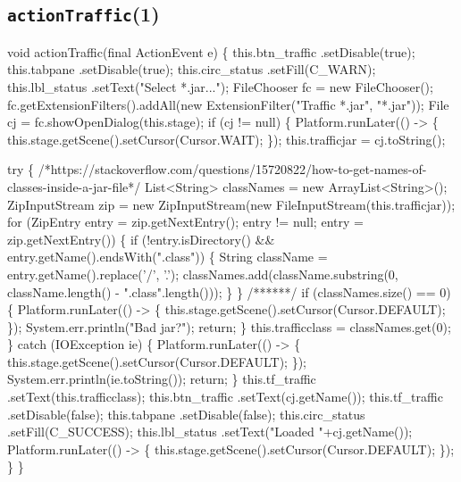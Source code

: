 \subsection{\texttt{actionTraffic}(1)}
\nwenddocs{}\endmoddef{}
void actionTraffic(final ActionEvent e) \{
  this.btn_traffic  .setDisable(true);
  this.tabpane      .setDisable(true);
  this.circ_status  .setFill(C_WARN);
  this.lbl_status   .setText("Select *.jar...");
  FileChooser fc = new FileChooser();
  fc.getExtensionFilters().addAll(new ExtensionFilter("Traffic *.jar", "*.jar"));
  File cj = fc.showOpenDialog(this.stage);
  if (cj != null) \{
    Platform.runLater(() -> \{
      this.stage.getScene().setCursor(Cursor.WAIT);
    \});
    this.trafficjar = cj.toString();

    try \{
/*https://stackoverflow.com/questions/15720822/how-to-get-names-of-classes-inside-a-jar-file*/
List<String> classNames = new ArrayList<String>();
ZipInputStream zip = new ZipInputStream(new FileInputStream(this.trafficjar));
for (ZipEntry entry = zip.getNextEntry(); entry != null; entry = zip.getNextEntry()) \{
  if (!entry.isDirectory() && entry.getName().endsWith(".class")) \{
    String className = entry.getName().replace('/', '.');
    classNames.add(className.substring(0, className.length() - ".class".length()));
  \}
\}
/******/
      if (classNames.size() == 0) \{
        Platform.runLater(() -> \{
          this.stage.getScene().setCursor(Cursor.DEFAULT);
        \});
        System.err.println("Bad jar?");
        return;
      \}
      this.trafficclass = classNames.get(0);
    \} catch (IOException ie) \{
      Platform.runLater(() -> \{
        this.stage.getScene().setCursor(Cursor.DEFAULT);
      \});
      System.err.println(ie.toString());
      return;
    \}
    this.tf_traffic   .setText(this.trafficclass);
    this.btn_traffic  .setText(cj.getName());
    this.tf_traffic   .setDisable(false);
    this.tabpane      .setDisable(false);
    this.circ_status  .setFill(C_SUCCESS);
    this.lbl_status   .setText("Loaded "+cj.getName());
    Platform.runLater(() -> \{
      this.stage.getScene().setCursor(Cursor.DEFAULT);
    \});
  \}
\}
\nwendcode{}\nwdocspar

